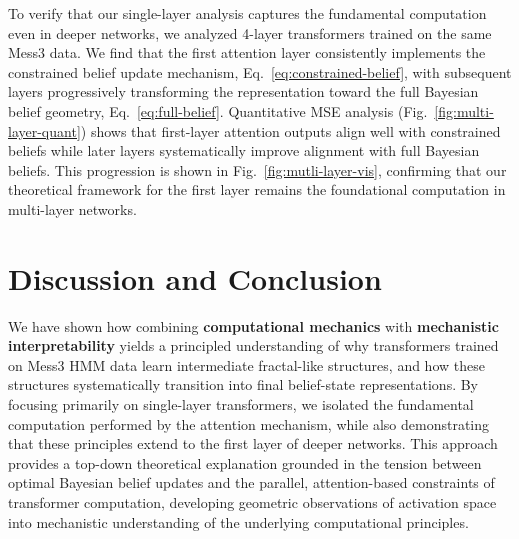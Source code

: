 \documentclass{article}
\theoremstyle{plain}
\theoremstyle{definition}
\theoremstyle{remark}
\begin{document}
To verify that our single-layer analysis captures the fundamental computation even in deeper networks, we analyzed 4-layer transformers trained on the same Mess3 data. We find that the first attention layer consistently implements the constrained belief update mechanism, Eq.~\eqref{eq:constrained-belief}, with subsequent layers progressively transforming the representation toward the full Bayesian belief geometry, Eq.~\eqref{eq:full-belief}. Quantitative MSE analysis (Fig.~\ref{fig:multi-layer-quant}) shows that first-layer attention outputs align well with constrained beliefs while later layers systematically improve alignment with full Bayesian beliefs. This progression is shown in Fig.~\ref{fig:mutli-layer-vis}, confirming that our theoretical framework for the first layer remains the foundational computation in multi-layer networks.


\section{Discussion and Conclusion}

We have shown how combining \textbf{computational mechanics} with \textbf{mechanistic interpretability} yields a principled understanding of why transformers trained on Mess3 HMM data learn intermediate fractal-like structures, and how these structures systematically transition into final belief-state representations.
By focusing primarily on single-layer transformers, we isolated the fundamental computation performed by the attention mechanism, while also demonstrating that these principles extend to the first layer of deeper networks. 
This approach provides a top-down theoretical explanation grounded in the tension between optimal Bayesian belief updates and the parallel, attention-based constraints of transformer computation, developing geometric observations of activation space into mechanistic understanding of the underlying computational principles.
\end{document}
